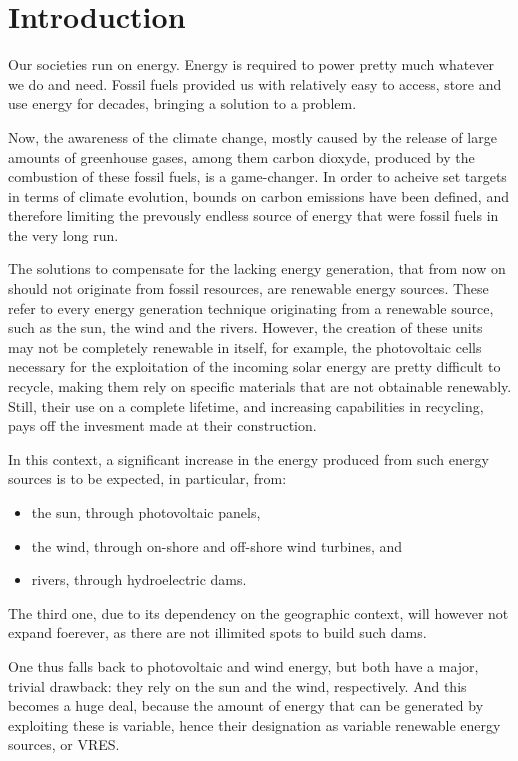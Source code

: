 \section{Introduction}

Our societies run on energy. Energy is required to power pretty much whatever we do and need. Fossil fuels provided us with relatively easy to access, store and use energy for decades, bringing a solution to a problem.

Now, the awareness of the climate change, mostly caused by the release of large amounts of greenhouse gases, among them carbon dioxyde, produced by the combustion of these fossil fuels, is a game-changer. In order to acheive set targets in terms of climate evolution, bounds on carbon emissions have been defined, and therefore limiting the prevously endless source of energy that were fossil fuels in the very long run.

The solutions to compensate for the lacking energy generation, that from now on should not originate from fossil resources, are renewable energy sources. These refer to every energy generation technique originating from a renewable source, such as the sun, the wind and the rivers. However, the creation of these units may not be completely renewable in itself, for example, the photovoltaic cells necessary for the exploitation of the incoming solar energy are pretty difficult to recycle, making them rely on specific materials that are not obtainable renewably. Still, their use on a complete lifetime, and increasing capabilities in recycling, pays off the invesment made at their construction.

In this context, a significant increase in the energy produced from such energy sources is to be expected, in particular, from:
\begin{itemize}
    \item the sun, through photovoltaic panels,
    \item the wind, through on-shore and off-shore wind turbines, and
    \item rivers, through hydroelectric dams.
\end{itemize}

The third one, due to its dependency on the geographic context, will however not expand foerever, as there are not illimited spots to build such dams.

One thus falls back to photovoltaic and wind energy, but both have a major, trivial drawback: they rely on the sun and the wind, respectively. And this becomes a huge deal, because the amount of energy that can be generated by exploiting these is variable, hence their designation as variable renewable energy sources, or VRES.

